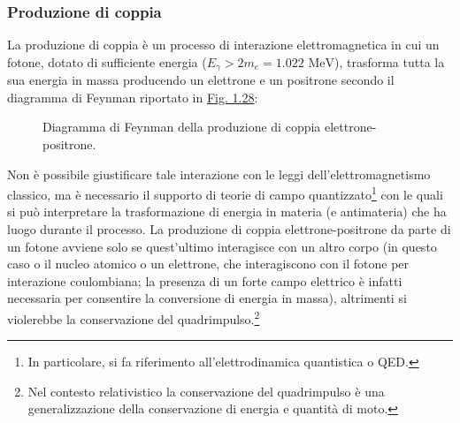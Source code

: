 \documentclass[12pt,a4paper,twoside]{report}
\begin{document}
	\subsubsection{Produzione di coppia}
	La produzione di coppia è un processo di interazione elettromagnetica in cui un fotone, dotato di sufficiente energia ($E_\gamma>2m_e=1.022\mbox{ MeV}$), trasforma tutta la sua energia in massa producendo un elettrone e un positrone secondo il diagramma di Feynman riportato in \hyperref[fig:feynman]{Fig. 1.28}:
	\begin{figure}
		\centering
		\caption{Diagramma di Feynman della produzione di coppia elettrone-positrone.}
		\label{fig:feynman}
	\end{figure}
	Non è possibile giustificare tale interazione con le leggi dell'elettromagnetismo classico, ma è necessario il supporto di teorie di campo quantizzato\footnote{In particolare, si fa riferimento all'elettrodinamica quantistica o QED.} con le quali si può interpretare la trasformazione di energia in materia (e antimateria) che ha luogo durante il processo. La produzione di coppia elettrone-positrone da parte di un fotone avviene solo se quest'ultimo interagisce con un altro corpo (in questo caso o il nucleo atomico o un elettrone, che interagiscono con il fotone per interazione coulombiana; la presenza di un forte campo elettrico è infatti necessaria per consentire la conversione di energia in massa), altrimenti si violerebbe la conservazione del quadrimpulso.\footnote{Nel contesto relativistico la conservazione del quadrimpulso è una generalizzazione della conservazione di energia e quantità di moto.}
	
\end{document}
